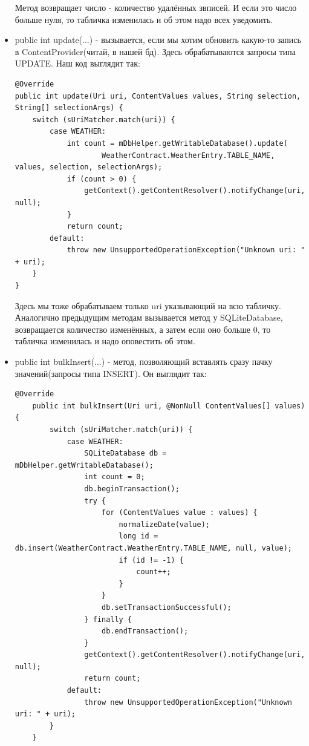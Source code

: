 \documentclass[12 pt]{article}
\begin{document}
\begin{itemize}
	    Метод возвращает число - количество удалённых звписей. И если это число больше нуля, то табличка изменилась и об этом надо всех уведомить.
	    \item public int update(...) - вызывается, если мы хотим обновить какую-то запись в ContentProvider(читай, в нашей бд). Здесь обрабатываются запросы типа UPDATE.
	    Наш код выглядит так:
	    \begin{lstlisting}
@Override
public int update(Uri uri, ContentValues values, String selection, String[] selectionArgs) {
    switch (sUriMatcher.match(uri)) {
        case WEATHER:
            int count = mDbHelper.getWritableDatabase().update(
                    WeatherContract.WeatherEntry.TABLE_NAME, values, selection, selectionArgs);
            if (count > 0) {
                getContext().getContentResolver().notifyChange(uri, null);
            }
            return count;
        default:
            throw new UnsupportedOperationException("Unknown uri: " + uri);
    }
}	    
	    \end{lstlisting}
	    Здесь мы тоже обрабатываем только uri указывающий на всю табличку. Аналогично предыдущим методам вызывается метод у SQLiteDatabase, возвращается количество изменённых, а затем если оно больше 0, то табличка изменилась и надо оповестить об этом.
	    \item public int bulkInsert(...) - метод, позволяющий вставлять сразу пачку значений(запросы типа INSERT).
	    Он выглядит так:
	    \begin{lstlisting}
@Override
    public int bulkInsert(Uri uri, @NonNull ContentValues[] values) {
        switch (sUriMatcher.match(uri)) {
            case WEATHER:
                SQLiteDatabase db = mDbHelper.getWritableDatabase();
                int count = 0;
                db.beginTransaction();
                try {
                    for (ContentValues value : values) {
                        normalizeDate(value);
                        long id = db.insert(WeatherContract.WeatherEntry.TABLE_NAME, null, value);
                        if (id != -1) {
                            count++;
                        }
                    }
                    db.setTransactionSuccessful();
                } finally {
                    db.endTransaction();
                }
                getContext().getContentResolver().notifyChange(uri, null);
                return count;
            default:
                throw new UnsupportedOperationException("Unknown uri: " + uri);
        }
    }


\end{lstlisting}
\end{itemize}
\end{document}
